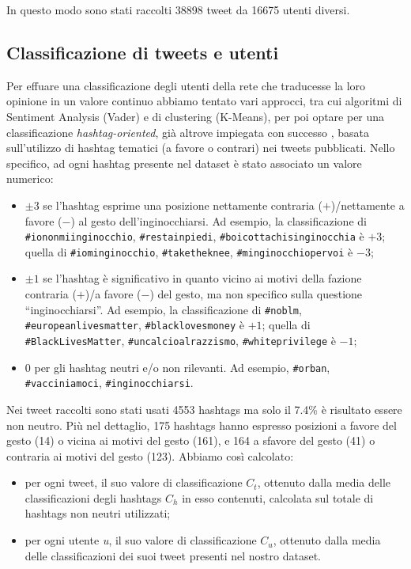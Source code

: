    In questo modo sono stati raccolti 38898 tweet da 16675 utenti diversi.
    
    \subsection{Classificazione di tweets e utenti}\label{subsection:class}
        
        Per effuare una classificazione degli utenti della rete che traducesse la loro opinione in un valore continuo abbiamo tentato vari approcci, tra cui algoritmi di Sentiment Analysis (Vader) e di clustering (K-Means), per poi optare per una classificazione \textit{hashtag-oriented}, già altrove impiegata con successo \cite{2019, WILLIAMS2015126}, basata sull'utilizzo di hashtag tematici (a favore o contrari) nei tweets pubblicati. Nello specifico, ad ogni hashtag presente nel dataset è stato associato un valore numerico:
        \begin{itemize}
            \item $\pm 3$ se l'hashtag esprime una posizione nettamente contraria ($+$)/nettamente a favore ($-$) al gesto dell'inginocchiarsi. Ad esempio, la classificazione di \texttt{\#iononmiinginocchio}, \texttt{\#restainpiedi}, \texttt{\#boicottachisinginocchia} è $+3$; quella di \texttt{\#iominginocchio}, \texttt{\#taketheknee}, \texttt{\#minginocchiopervoi} è $-3$;
            \item $\pm 1$ se l'hashtag è significativo in quanto vicino ai motivi della fazione contraria ($+$)/a favore ($-$) del gesto, ma non specifico sulla questione “inginocchiarsi”. Ad esempio, la classificazione di \texttt{\#noblm}, \texttt{\#europeanlivesmatter}, \texttt{\#blacklovesmoney} è $+1$; quella di \texttt{\#BlackLivesMatter}, \texttt{\#uncalcioalrazzismo}, \texttt{\#whiteprivilege} è $-1$;
            \item 0 per gli hashtag neutri e/o non rilevanti. Ad esempio, \texttt{\#orban}, \texttt{\#vacciniamoci}, \texttt{\#inginocchiarsi}.
        \end{itemize}
    Nei tweet raccolti sono stati usati 4553 hashtags ma solo il 7.4\% è risultato essere non neutro. Più nel dettaglio, 175 hashtags hanno espresso posizioni a favore del gesto (14) o vicina ai motivi del gesto  (161), e 164 a sfavore del gesto (41) o contraria ai motivi del gesto (123).
    Abbiamo così calcolato:
    \begin{itemize}
        \item per ogni tweet, il suo valore di classificazione $C_{t}$, ottenuto dalla media delle classificazioni degli hashtags $C_{h}$ in esso contenuti, calcolata sul totale di hashtags non neutri utilizzati;
        \item per ogni utente \textit{u}, il suo valore di classificazione $C_{u}$, ottenuto dalla media delle classificazioni dei suoi tweet presenti nel nostro dataset.
    \end{itemize} 
    
